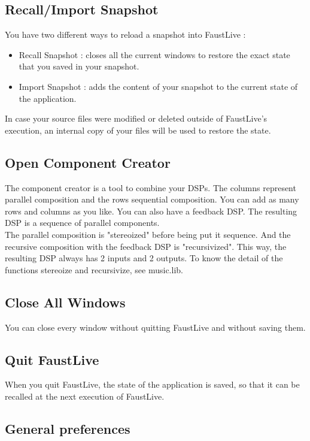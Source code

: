 \documentclass[a4paper]{article}
\begin{document}
\subsection{Recall/Import Snapshot}
You have two different ways to reload a snapshot into FaustLive : 
\begin{itemize}
\item Recall Snapshot : closes all the current windows to restore the exact state that you saved in your snapshot.
\item Import Snapshot : adds the content of your snapshot to the current state of the application. 
\end{itemize}

In case your source files were modified or deleted outside of FaustLive's execution, an internal copy of your files will be used to restore the state. 

\subsection{Open Component Creator}
The component creator is a tool to combine your DSPs. The columns represent parallel composition and the rows sequential composition. You can add as many rows and columns as you like. You can also have a feedback DSP. The resulting DSP is a sequence of parallel components. \\

The parallel composition is "stereoized" before being put it sequence. And the recursive composition with the feedback DSP is "recursivized". This way, the resulting DSP always has 2 inputs and 2 outputs. To know the detail of the functions stereoize and recursivize, see music.lib. 


\subsection{Close All Windows}
You can close every window without quitting FaustLive and without saving them.

\subsection{Quit FaustLive}

When you quit FaustLive, the state of the application is saved, so that it can be recalled at the next execution of FaustLive.

\subsection{General preferences}
\end{document}

